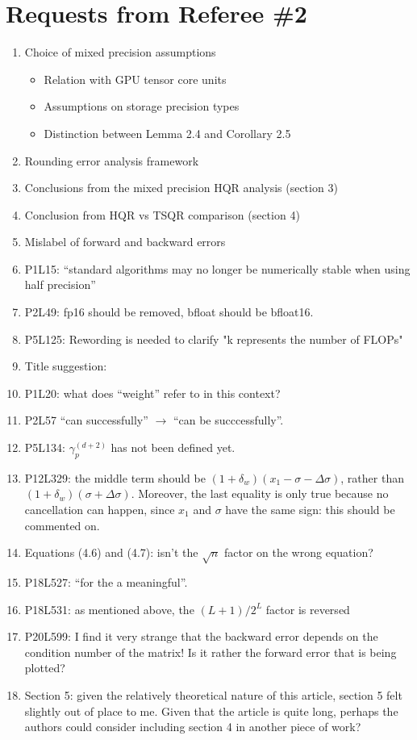 \documentclass[10pt]{article}
\newcommand{\dd}{\delta}
\begin{document}
\section*{Requests from Referee \#2}
\begin{enumerate}
	\item Choice of mixed precision assumptions
	\begin{itemize}
		\item Relation with GPU tensor core units
		\item Assumptions on storage precision types
		\item Distinction between Lemma 2.4 and Corollary 2.5
	\end{itemize}
	\item Rounding error analysis framework
	\item Conclusions from the mixed precision HQR analysis (section 3)
	\item Conclusion from HQR vs TSQR comparison (section 4)
	\item Mislabel of forward and backward errors
	\item P1L15: ``standard algorithms may no longer be numerically stable when using half precision''
	\item P2L49: fp16 should be removed, bfloat should be bfloat16.
	\item P5L125: Rewording is needed to clarify "k represents the number of FLOPs" 
	\item Title suggestion:
	\item P1L20: what does ``weight'' refer to in this context?
	\item P2L57 ``can successfully'' $\rightarrow$ ``can be succcessfully''.
	\item P5L134: $\gamma_p^{(d+2)}$ has not been defined yet.
	\item P12L329: the middle term should be $(1+\dd_w)(x_1-\sigma-\Delta\sigma)$, rather than $(1+\dd_w)(\sigma+\Delta\sigma)$. Moreover, the last equality is only true because no cancellation can happen, since $x_1$ and $\sigma$ have the same sign: this should be commented on.
	\item Equations (4.6) and (4.7): isn't the $\sqrt{n}$ factor on the wrong equation?
	\item P18L527: ``for the a meaningful''.
	\item P18L531: as mentioned above, the $(L+1)/2^L$ factor is reversed
	\item P20L599: I find it very strange that the backward error depends on the condition number of the matrix! Is it rather the forward error that is being plotted?
	\item Section 5: given the relatively theoretical nature of this article, section 5 felt slightly out of place to me. Given that the article is quite long, perhaps the authors could consider including section 4 in another piece of work? 
	
\end{enumerate}


\end{document}
